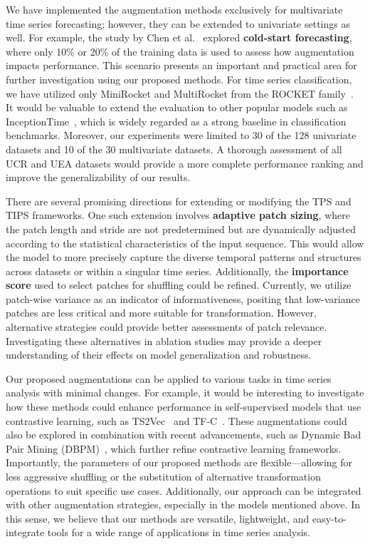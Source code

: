 We have implemented the augmentation methods exclusively for multivariate time series forecasting; however, they can be extended to univariate settings as well. For example, the study by Chen et al.~\cite{chen2023fraugfrequencydomainaugmentation} explored \textbf{cold-start forecasting}, where only 10\% or 20\% of the training data is used to assess how augmentation impacts performance. This scenario presents an important and practical area for further investigation using our proposed methods.
For time series classification, we have utilized only MiniRocket and MultiRocket from the ROCKET family~\cite{Dempster_2020}. It would be valuable to extend the evaluation to other popular models such as InceptionTime~\cite{Ismail_Fawaz_2020}, which is widely regarded as a strong baseline in classification benchmarks. Moreover, our experiments were limited to 30 of the 128 univariate datasets and 10 of the 30 multivariate datasets. A thorough assessment of all UCR and UEA datasets would provide a more complete performance ranking and improve the generalizability of our results.


There are several promising directions for extending or modifying the TPS and TIPS frameworks. One such extension involves \textbf{adaptive patch sizing}, where the patch length and stride are not predetermined but are dynamically adjusted according to the statistical characteristics of the input sequence. This would allow the model to more precisely capture the diverse temporal patterns and structures across datasets or within a singular time series. Additionally, the \textbf{importance score} used to select patches for shuffling could be refined. Currently, we utilize patch-wise variance as an indicator of informativeness, positing that low-variance patches are less critical and more suitable for transformation. However, alternative strategies could provide better assessments of patch relevance. Investigating these alternatives in ablation studies may provide a deeper understanding of their effects on model generalization and robustness.


Our proposed augmentations can be applied to various tasks in time series analysis with minimal changes. For example, it would be interesting to investigate how these methods could enhance performance in self-supervised models that use contrastive learning, such as TS2Vec~\cite{Yue_Wang_Duan_Yang_Huang_Tong_Xu_2022} and TF-C~\cite{zhang2022selfsupervisedcontrastivepretrainingtime}. These augmentations could also be explored in combination with recent advancements, such as Dynamic Bad Pair Mining (DBPM)~\cite{lan2024enhancingtimeseriescontrastive}, which further refine contrastive learning frameworks. Importantly, the parameters of our proposed methods are flexible—allowing for less aggressive shuffling or the substitution of alternative transformation operations to suit specific use cases. Additionally, our approach can be integrated with other augmentation strategies, especially in the models mentioned above. In this sense, we believe that our methods are versatile, lightweight, and easy-to-integrate tools for a wide range of applications in time series analysis.


